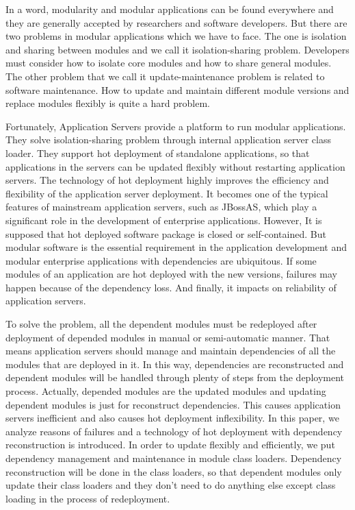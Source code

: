\documentclass[conference]{IEEEtran}
\begin{document}
In a word, modularity and modular applications can be found everywhere and they are generally accepted by researchers and software developers.
But there are two problems in modular applications which we have to face.
The one is isolation and sharing between modules and we call it isolation-sharing problem. 
Developers must consider how to isolate core modules and how to share general modules.
The other problem that we call it update-maintenance problem is related to software maintenance.
How to update and maintain different module versions and replace modules flexibly is quite a hard problem.

Fortunately, Application Servers\cite{app_server} provide a platform to run modular applications.
They solve isolation-sharing problem through internal application server class loader. 
They support hot deployment of standalone applications, so that applications in the servers can be updated flexibly without restarting application servers.
The technology of hot deployment highly improves the efficiency and flexibility of the application server deployment.
It becomes one of the typical features of mainstream application servers, such as JBossAS\cite{jboss}, which play a significant role in the development of enterprise applications.
However, It is supposed that hot deployed software package is closed or self-contained.
But modular software is the essential requirement in the application development and modular enterprise applications with dependencies are ubiquitous.
If some modules of an application are hot deployed with the new versions, failures may happen because of the dependency loss.
And finally, it impacts on reliability of application servers\cite{middleware_reliability}.

To solve the problem, all the dependent modules must be redeployed after deployment of depended modules in manual or semi-automatic manner.
That means application servers should manage and maintain dependencies of all the modules that are deployed in it.
In this way, dependencies are reconstructed and dependent modules will be handled through plenty of steps from the deployment process.
Actually, depended modules are the updated modules and updating dependent modules is just for reconstruct dependencies.
This causes application servers inefficient and also causes hot deployment inflexibility.
In this paper, we analyze reasons of failures and a technology of hot deployment with dependency reconstruction is introduced.
In order to update flexibly and efficiently, we put dependency management and maintenance in module class loaders.
Dependency reconstruction will be done in the class loaders, so that dependent modules only update their class loaders and they don't need to do anything else except class loading in the process of redeployment.
\end{document}
